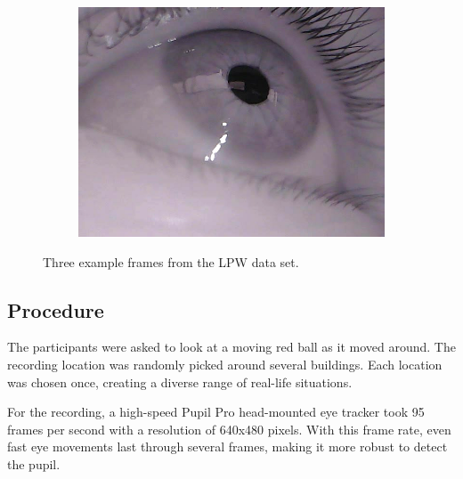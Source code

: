\begin{figure}[ht]
\begin{subfigure}{.30\textwidth}
      \label{fig:ds2}
    \end{subfigure}%
    \begin{subfigure}{.30\textwidth}
      \centering
      \includegraphics[width=.9\linewidth]{plots/eye_dataset/eye3.png}

      \label{fig:ds3}
    \end{subfigure}
    \caption{Three example frames from the LPW data set.}
    \label{fig:example_frame}
    \end{figure}

    \subsection{Procedure}
    The participants were asked to look at a moving red ball as it moved around. The recording location was randomly picked around several buildings. Each location was chosen once, creating a diverse range of real-life situations. 

    For the recording, a high-speed Pupil Pro head-mounted eye tracker took 95 frames per second with a resolution of 640x480 pixels. With this frame rate, even fast eye movements last through several frames, making it more robust to detect the pupil.


